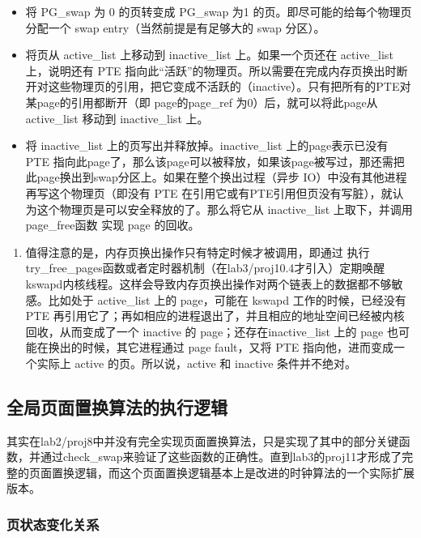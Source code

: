 \begin{itemize}
\item
  将 PG\_swap 为 0 的页转变成 PG\_swap 为1
  的页。即尽可能的给每个物理页分配一个 swap entry（当然前提是有足够大的
  swap 分区）。
\item
  将页从 active\_list 上移动到 inactive\_list 上。如果一个页还在
  active\_list 上，说明还有 PTE
  指向此``活跃''的物理页。所以需要在完成内存页换出时断开对这些物理页的引用，把它变成不活跃的（inactive）。只有把所有的PTE对某page的引用都断开（即
  page的page\_ref 为0）后，就可以将此page从 active\_list 移动到
  inactive\_list 上。
\item
  将 inactive\_list 上的页写出并释放掉。inactive\_list
  上的page表示已没有 PTE
  指向此page了，那么该page可以被释放，如果该page被写过，那还需把此page换出到swap分区上。如果在整个换出过程（异步
  IO）中没有其他进程再写这个物理页（即没有 PTE
  在引用它或有PTE引用但页没有写脏），就认为这个物理页是可以安全释放的了。那么将它从
  inactive\_list 上取下，并调用 page\_free函数 实现 page 的回收。
\end{itemize}

\begin{enumerate}
\def\labelenumi{\arabic{enumi}.}
\setcounter{enumi}{3}
\item
  值得注意的是，内存页换出操作只有特定时候才被调用，即通过
  执行try\_free\_pages函数或者定时器机制（在lab3/proj10.4才引入）定期唤醒kswapd内核线程。这样会导致内存页换出操作对两个链表上的数据都不够敏感。比如处于
  active\_list 上的 page，可能在 kswapd 工作的时候，已经没有 PTE
  再引用它了；再如相应的进程退出了，并且相应的地址空间已经被内核回收，从而变成了一个
  inactive 的 page；还存在inactive\_list 上的 page
  也可能在换出的时候，其它进程通过 page fault，又将 PTE
  指向他，进而变成一个实际上 active 的页。所以说，active 和 inactive
  条件并不绝对。
\end{enumerate}

\subsection{全局页面置换算法的执行逻辑}\label{ux5168ux5c40ux9875ux9762ux7f6eux6362ux7b97ux6cd5ux7684ux6267ux884cux903bux8f91}

其实在lab2/proj8中并没有完全实现页面置换算法，只是实现了其中的部分关键函数，并通过check\_swap来验证了这些函数的正确性。直到lab3的proj11才形成了完整的页面置换逻辑，而这个页面置换逻辑基本上是改进的时钟算法的一个实际扩展版本。

\subsubsection{页状态变化关系}\label{ux9875ux72b6ux6001ux53d8ux5316ux5173ux7cfb}

